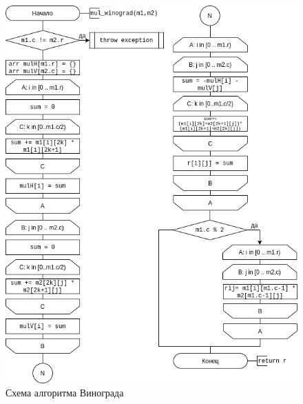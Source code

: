 \begin{figure}[h!]
    \centering
    \includegraphics[width=1\textwidth]{2/inc/d2.png}
    \caption{Схема алгоритма Винограда}
    \label{fig:2.2}
\end{figure}

